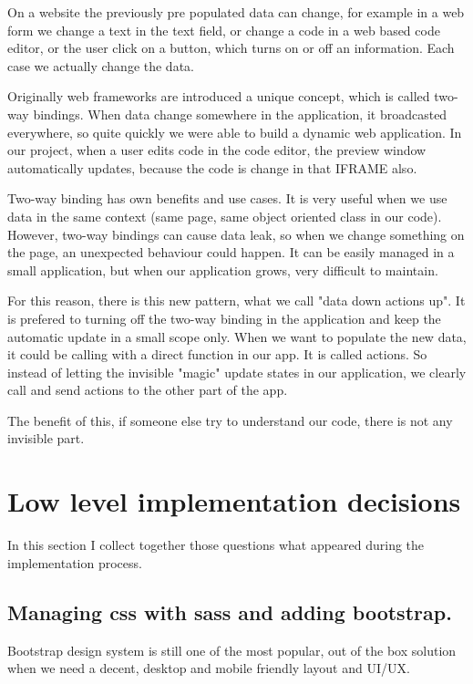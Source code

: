 \documentclass[12pt, a4paper, oneside, openright, medskipamount]{report}
\begin{document}
On a website the previously pre populated data can change, for example in a web form we change a text in the text field, or change a code in a web based code editor, or the user click on a button, which turns on or off an information. Each case we actually change the data.

Originally web frameworks are introduced a unique concept, which is called two-way bindings. When data change somewhere in the application, it broadcasted everywhere, so quite quickly we were able to build a dynamic web application. In our project, when a user edits code in the code editor, the preview window automatically updates, because the code is change in that IFRAME also.

Two-way binding has own benefits and use cases. It is very useful when we use data in the same context (same page, same object oriented class in our code). However, two-way bindings can cause data leak, so when we change something on the page, an unexpected behaviour could happen. It can be easily managed in a small application, but when our application grows, very difficult to maintain.

For this reason, there is this new pattern, what we call "data down actions up". It is prefered to turning off the two-way binding in the application and keep the automatic update in a small scope only. When we want to populate the new data, it could be calling with a direct function in our app. It is called actions. So instead of letting the invisible "magic" update states in our application, we clearly call and send actions to the other part of the app.

The benefit of this, if someone else try to understand our code, there is not any invisible part.

\section{Low level implementation decisions}

In this section I collect together those questions what appeared during the implementation process.

\subsection{Managing css with sass and adding bootstrap.}

Bootstrap\cite{bootstrap} design system is still one of the most popular, out of the box solution when we need a decent, desktop and mobile friendly layout and UI/UX.
\end{document}
